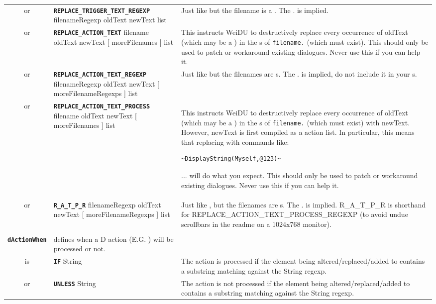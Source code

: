 \documentclass{article}
\def\ttref#1{\ahrefloc{#1}{\tt #1}}
\def\DEFINE#1{{\tt \bf #1}\label{#1}\index{#1}}
\def\DEFSYN#1{{\tt \bf #1}\index{#1}}
\def\t#1{{\tt #1}}
\def\Slist{{\color{red} list }}
\def\Ob{{\color{red} [ }}
\def\Oe{{\color{red} ] }}
\begin{document}
\begin{tabular}{cp{10in}|p{10in}}
  or & \DEFINE{REPLACE_TRIGGER_TEXT_REGEXP} filenameRegexp oldText newText
 \ttref{dActionWhen} \Slist  &
  Just like \ttref{REPLACE_TRIGGER_TEXT} but the filename is a
  \ttref{regexp}. The .\ttref{DLG} is implied. \\

  or & \DEFINE{REPLACE_ACTION_TEXT} filename oldText newText
    \Ob moreFilenames \Oe  \ttref{dActionWhen} \Slist &
  This instructs WeiDU to destructively replace every occurrence of oldText
  (which may be a \ttref{regexp}) in the \ttref{stateActionString}s
  of \t{filename.}\ttref{DLG} (which must exist). This should only be used
  to patch or workaround existing dialogues. Never use this if you can help
  it. \\

  or & \DEFINE{REPLACE_ACTION_TEXT_REGEXP} filenameRegexp oldText newText
    \Ob moreFilenameRegexps \Oe  \ttref{dActionWhen} \Slist &
  Just like \ttref{REPLACE_ACTION_TEXT} but the filenames are
  \ttref{regexp}s. The .\ttref{DLG} is implied, do not include it in your
  \ttref{regexp}s. \\

  or & \DEFINE{REPLACE_ACTION_TEXT_PROCESS} filename oldText newText
    \Ob moreFilenames \Oe \ttref{dActionWhen} \Slist &
  This instructs WeiDU to destructively replace every occurrence of oldText
  (which may be a \ttref{regexp}) in the \ttref{stateActionString}s
  of \t{filename.}\ttref{DLG} (which must exist) with newText. However,
  newText is first compiled as a \ttref{BAF} action list. In particular,
  this means that replacing with commands like:
\begin{verbatim}
~DisplayString(Myself,@123)~
\end{verbatim}
  ... will do what you expect.  This should only be used to patch or
  workaround existing dialogues. Never use this if you can help it. \\

  or & \DEFINE{R_A_T_P_R}
    filenameRegexp oldText newText
    \Ob moreFilenameRegexps \Oe \ttref{dActionWhen} \Slist &
  Just like \ttref{REPLACE_ACTION_TEXT_PROCESS}, but the filenames are
  \ttref{regexp}s. The .\ttref{DLG} is implied. R_A_T_P_R is
  shorthand for REPLACE_ACTION_TEXT_PROCESS_REGEXP (to avoid undue scrollbars
  in the readme on a 1024x768 monitor). \\


\\

\DEFINE{dActionWhen} & defines when a D action (E.G. \ttref{ADD_TRANS_ACTION}) will
be processed or not. \\
is & \DEFSYN{IF} String & The action is processed if the element being
altered/replaced/added to contains a substring matching against the String
regexp. \\
or & \DEFSYN{UNLESS} String & The action is not processed if the element being
altered/replaced/added to contains a substring matching against the String
regexp. \\


\end{tabular}
\end{document}

